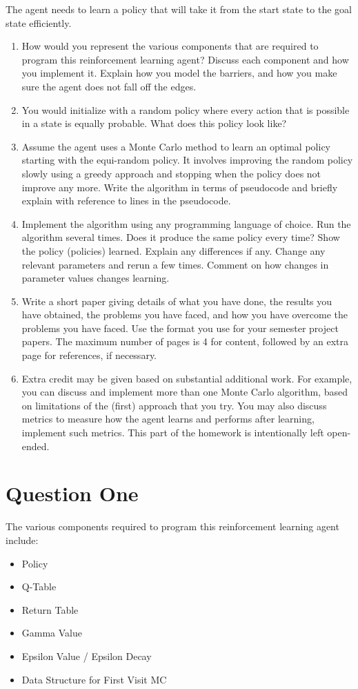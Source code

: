 \documentclass[letterpaper]{article}
\begin{document}
The agent needs to learn a policy that will take it from the start state to the goal state efficiently.

\begin{enumerate}
\item How would you represent the various components that are required to program this reinforcement learning agent? Discuss each component and how you implement it. Explain how you model the barriers, and how you make sure the agent does not fall off the edges.
\item You would initialize with a random policy where every action that is possible in a state is equally probable. What does this policy look like?
\item Assume the agent uses a Monte Carlo method to learn an optimal policy starting with the equi-random policy. It involves improving the random policy slowly using a greedy approach and stopping when the policy does not improve any more. Write the algorithm in terms of pseudocode and briefly explain with reference to lines in the pseudocode.
\item Implement the algorithm using any programming language of choice. Run the algorithm several times. Does it produce the same policy every time? Show the policy  (policies) learned. Explain any differences if any. Change any relevant parameters and rerun a few times. Comment on how changes in parameter values changes learning.
\item Write a short paper giving details of what you have done, the results you have obtained, the problems you have faced, and how you have overcome the problems you have faced. Use the format you use for your semester project papers. The maximum number of pages is 4 for content, followed by an extra page for references, if necessary.
\item Extra credit may be given based on substantial additional work. For example, you can discuss and implement more than one Monte Carlo algorithm, based on limitations of the  (first) approach that you try. You may also discuss metrics to measure how the agent learns and performs after learning, implement such metrics. This part of the homework is intentionally left open-ended.
\end{enumerate}

\section{Question One}
\noindent The various components required to program this reinforcement learning agent include: 
\begin{itemize}
\item Policy
\item Q-Table
\item Return Table
\item Gamma Value
\item Epsilon Value / Epsilon Decay
\item Data Structure for First Visit MC
\end{itemize}
\end{document}
